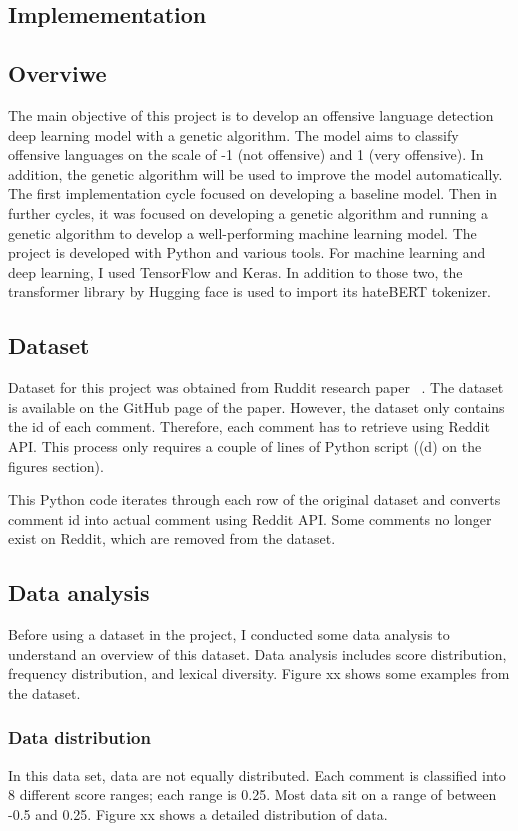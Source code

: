 \documentclass[11pt, natbib=false]{article}
\begin{document}
\begin{multicols}{2}
\section{Implemementation}
\subsection{Overviwe}
The main objective of this project is to develop an offensive language detection deep learning model with a genetic algorithm.
The model aims to classify offensive languages on the scale of -1 (not offensive) and 1 (very offensive).
In addition, the genetic algorithm will be used to improve the model automatically.
The first implementation cycle focused on developing a baseline model.
Then in further cycles, it was focused on developing a genetic algorithm and running a genetic algorithm to develop a well-performing machine learning model.
The project is developed with Python and various tools.
For machine learning and deep learning, I used TensorFlow and Keras.
In addition to those two, the transformer library by Hugging face is used to import its hateBERT tokenizer.

\subsection{Dataset}
Dataset for this project was obtained from Ruddit research paper ~\cite{hada2021ruddit}.
The dataset is available on the GitHub page of the paper.
However, the dataset only contains the id of each comment.
Therefore, each comment has to retrieve using Reddit API.
This process only requires a couple of lines of Python script ((d) on the figures section).

This Python code iterates through each row of the original dataset and converts comment id into actual comment using Reddit API.
Some comments no longer exist on Reddit, which are removed from the dataset.

\subsection{Data analysis}
Before using a dataset in the project, I conducted some data analysis to understand an overview of this dataset.
Data analysis includes score distribution, frequency distribution, and lexical diversity.
Figure xx shows some examples from the dataset.

\subsubsection{Data distribution}
In this data set, data are not equally distributed.
Each comment is classified into 8 different score ranges; each range is 0.25. Most data sit on a range of between -0.5 and 0.25.
Figure xx shows a detailed distribution of data.


\end{multicols}
\end{document}

